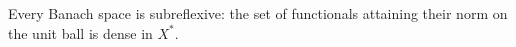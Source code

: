 Every Banach space is subreflexive: the set of functionals attaining their norm on the unit ball is dense in $X^*$.

